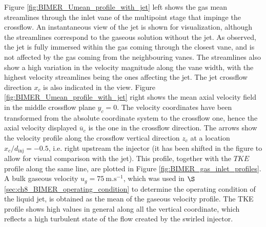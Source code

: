 Figure \ref{fig:BIMER_Umean_profile_with_jet} left shows the gas mean streamlines through the inlet vane of the multipoint stage that impinge the crossflow. An instantaneous view of the jet is shown for visualization, although the streamlines correspond to the gaseous solution without the jet. As observed, the jet is fully immersed within the gas coming through the closest vane, and is not affected by the gas coming from the neighbouring vanes. The streamlines also show a high variation in the velocity magnitude along the vane width, with the highest velocity streamlines being the ones affecting the jet. The jet crossflow direction $x_c$ is also indicated in the view. Figure \ref{fig:BIMER_Umean_profile_with_jet} right shows the mean axial velocity field in the middle crossflow plane $y_c = 0$. The velocity coordinates have been transformed from the absolute coordinate system to the crossflow one, hence the axial velocity displayed $\overline{u}_c$ is the one in the crossflow direction. The arrows show the velocity profile along the crossflow vertical direction $z_c$ at a location $x_c/d_\mathrm{inj} = -0.5$, i.e. right upstream the injector (it has been shifted in the figure to allow for visual comparison with the jet). This profile, together with the $TKE$ profile along the same line, are plotted in Figure \ref{fig:BIMER_gas_inlet_profiles}. A bulk gaseous velocity $u_g = 75 ~\mathrm{m}.\mathrm{s}^{-1}$, which was used in $\S$\ref{sec:ch8_BIMER_operating_condition} to determine the operating condition of the liquid jet, is obtained as the mean of the gaseous velocity profile. The TKE profile shows high values in general along all the vertical coordinate, which reflects a high turbulent state of the flow created by the swirled injector. %



